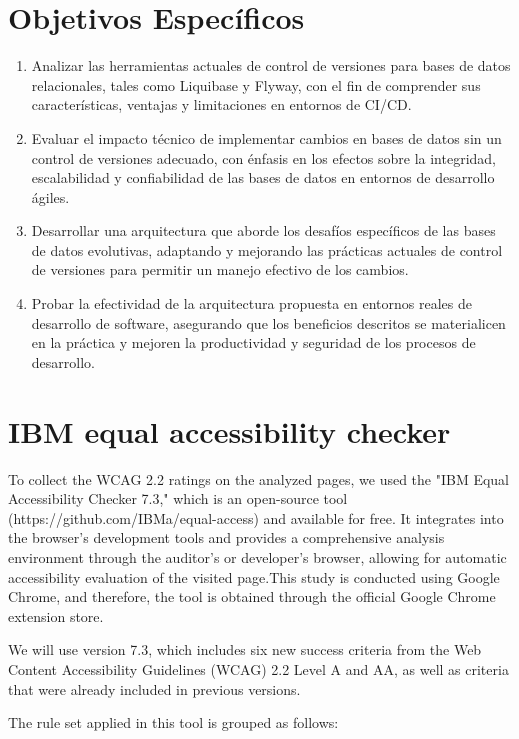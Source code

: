 \documentclass{IEEEtran}
\begin{document}
\section{Objetivos Específicos}
\begin{enumerate}
    \item Analizar las herramientas actuales de control de versiones para bases de datos relacionales, tales como Liquibase y Flyway, con el fin de comprender sus características, ventajas y limitaciones en entornos de CI/CD.
    \item Evaluar el impacto técnico de implementar cambios en bases de datos sin un control de versiones adecuado, con énfasis en los efectos sobre la integridad, escalabilidad y confiabilidad de las bases de datos en entornos de desarrollo ágiles.
    \item Desarrollar una arquitectura que aborde los desafíos específicos de las bases de datos evolutivas, adaptando y mejorando las prácticas actuales de control de versiones para permitir un manejo efectivo de los cambios.
    \item Probar la efectividad de la arquitectura propuesta en entornos reales de desarrollo de software, asegurando que los beneficios descritos se materialicen en la práctica y mejoren la productividad y seguridad de los procesos de desarrollo.
\end{enumerate}

\section{IBM equal accessibility checker}
To collect the WCAG 2.2 ratings on the analyzed pages, we used the "IBM Equal Accessibility Checker 7.3," which is an open-source tool (https://github.com/IBMa/equal-access) and available for free. It integrates into the browser's development tools and provides a comprehensive analysis environment through the auditor's or developer's browser, allowing for automatic accessibility evaluation of the visited page.This study is conducted using Google Chrome, and therefore, the tool is obtained through the official Google Chrome extension store.\cite{IBMAccessibilityEqualAccessToolkit}

We will use version 7.3, which includes six new success criteria from the Web Content Accessibility Guidelines (WCAG) 2.2 Level A and AA, as well as criteria that were already included in previous versions.

The rule set applied in this tool is grouped as follows:
\end{document}
